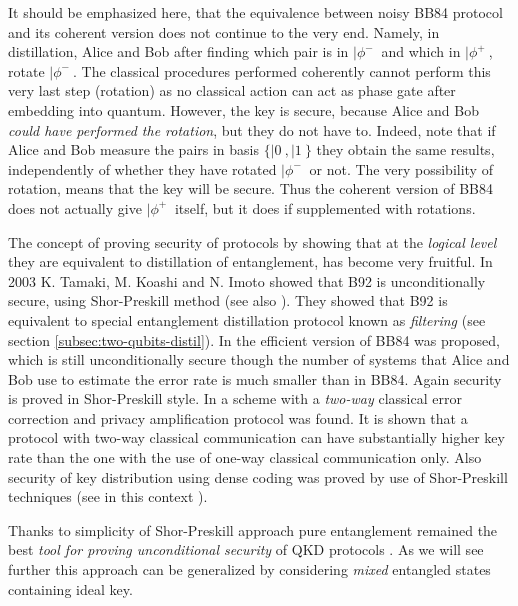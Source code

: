 \documentclass[rmp,12pt,preprint]{revtex4-2}
\begin{document}
It should be emphasized here, that the equivalence between noisy BB84
protocol and its coherent version does not continue to the very
end. Namely, in distillation, Alice and Bob after finding which pair
is in $|\phi^-\>$ and which in $|\phi^+\>$, rotate $|\phi^-\>$. The
classical procedures performed coherently cannot perform this very
last step (rotation) as no classical action can act as phase gate
after embedding into quantum. However, the key is secure, because
Alice and Bob {\it could have performed the rotation}, but they do not
have to. Indeed, note that if Alice and Bob measure the pairs in basis
$\{|0\>,|1\>\}$ they obtain the same results, independently of whether
they have rotated $|\phi^-\>$ or not. The very possibility of
rotation, means that the key will be secure. Thus the coherent version
of BB84 does not actually give $|\phi^+\>$ itself, but it does if
supplemented with rotations.

The concept of proving security of \pmp protocols by showing that at
the {\it logical level} they are equivalent to distillation of
entanglement, has become very fruitful. In 2003 K. Tamaki, M. Koashi
and N. Imoto \cite{Tamaki03:secB92} showed that B92 is unconditionally
secure, using Shor-Preskill method (see also
\cite{TamakiLutkenhaus04}). They showed that B92 is equivalent to
special entanglement distillation protocol known as {\it filtering}
\cite{Gisin96,HHH1997-distill} (see section
\ref{subsec:two-qubits-distil}). In \cite{lca} the efficient version
of BB84 was proposed, which is still unconditionally secure though the
number of systems that Alice and Bob use to estimate the error rate is
much smaller than in BB84. Again security is proved in Shor-Preskill
style. In \cite{Gottesman-Lo} a \pmp scheme with a {\it two-way}
classical error correction and privacy amplification protocol was
found. It is shown that a protocol with two-way classical
communication can have substantially higher key rate than the one with
the use of one-way classical communication only.
Also security of key distribution using dense coding  \cite{LongLiu2002} was proved
by use of Shor-Preskill techniques \cite{ZhangWenLong2005} (see in this
context \cite{DegiovanniRCRBCC2003-dense-qkd,Wojcik-dense-qkd,RepToCommQDKD}).

Thanks to simplicity of Shor-Preskill approach pure entanglement
remained the best {\it tool for proving unconditional security} of QKD
protocols \cite{Crypt_ent_withent}.  As we will see further this approach can be
generalized by considering {\it mixed} entangled states containing
ideal key.
\end{document}
